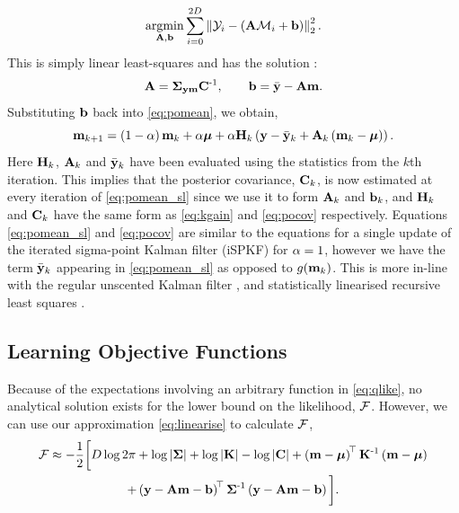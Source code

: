 \documentclass{article} %
\begin{document}
\begin{equation}
    \argmin_{\Linmat, \intcpt} \sum^{2D}_{i=0} 
        \lnorm{2}{\Sobs_i - \brac{\Linmat\Sfunc_i + \intcpt}}^2.
\end{equation}
This is simply linear least-squares and has the solution \cite{Geist2010}:
\begin{equation}
    \Linmat = \xcov \pocov\inv, \qquad
    \intcpt = \bar\obs - \Linmat\pomean.
\end{equation}
Substituting $\intcpt$ back into \eqref{eq:pomean}, we obtain, 
\begin{equation}
    \pomean_{k+1} = \brac{1-\step}\pomean_k + \step\prmean 
        + \step\Kgain_k\brac{\obs - \bar\obs_k 
        + \Linmat_k\brac{\pomean_k - \prmean}}.
    \label{eq:pomean_sl}
\end{equation}
Here $\Kgain_k$, $\Linmat_k$ and $\bar\obs_k$ have been evaluated using the
statistics from the $k$th iteration. This implies that the posterior
covariance, $\pocov_k$, is now estimated at every iteration of
\eqref{eq:pomean_sl} since we use it to form $\Linmat_k$ and $\intcpt_k$, and 
$\Kgain_k$ and $\pocov_k$ have the same form as \eqref{eq:kgain} and
\eqref{eq:pocov} respectively. Equations \eqref{eq:pomean_sl} and
\eqref{eq:pocov} are similar to the equations for a single update of the
iterated sigma-point Kalman filter (iSPKF) \cite{Sibley2006} for $\step = 1$,
however we have the term $\bar\obs_k$ appearing in \eqref{eq:pomean_sl} as
opposed to $\nonlin{\pomean_k}$. This is more in-line with the regular
unscented Kalman filter \cite{Julier2004}, and statistically linearised
recursive least squares \cite{Geist2010}.


\subsection{Learning Objective Functions}

Because of the expectations involving an arbitrary function in
\eqref{eq:qlike}, no analytical solution exists for the lower bound on the
likelihood, $\Fengy$. However, we can use our approximation
\eqref{eq:linearise} to calculate $\Fengy$,
\begin{multline}
    \Fengy \approx - \frac{1}{2} \bigg[
        D\log{2\pi} + \log\deter{\lcov} + \log\deter{\prcov} 
        - \log\deter{\pocov}
    + \brac{\pomean - \prmean}\transpose\prcov\inv
        \brac{\pomean - \prmean} \\
    + \brac{\obs - \Linmat\pomean - \intcpt}\transpose\lcov\inv
        \brac{\obs - \Linmat\pomean - \intcpt}
        \bigg].
    \label{eq:approxfengy}
\end{multline}
\end{document}
